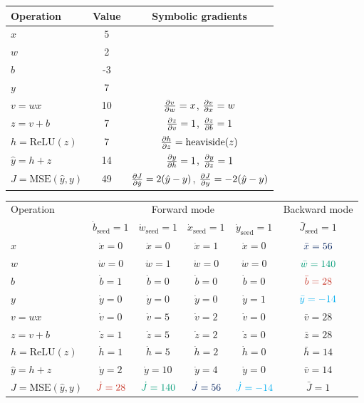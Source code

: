 \clearpage
\begin{solution}
\begin{center}
\begin{tabular}{lcc}
\toprule
Operation & Value & Symbolic gradients \\
\midrule
$x$ & 5 \\
$w$ & 2 \\
$b$ & -3 \\
$y$ & 7 \\
$v=wx$ & 10 & $\pdv{v}{w} = x$, $\pdv{v}{x} = w$ \\
$z=v+b$ & 7 & $\pdv{z}{v} = 1$, $\pdv{z}{b} = 1$\\
$h=\mathrm{ReLU}(z)$ & 7 & $\pdv{h}{z}=\mathrm{heaviside}(z)$ \\
$\hat y = h + z$ & 14 & $\pdv{y}{h}=1$, $\pdv{y}{z}=1$ \\
$J=\mathrm{MSE}(\hat y, y)$ & 49 & $\pdv{J}{\hat y}=2(\hat y - y)$, $\pdv{J}{y}=-2(\hat y - y)$ \\
\bottomrule
\end{tabular}
\end{center}

\begin{center}
\begin{tabular}{lccccc}
\toprule
Operation & \multicolumn{4}{c}{Forward mode} & Backward mode \\
& $\dot b_{\mathrm{seed}}=1$ & $\dot w_{\mathrm{seed}}=1$ & $\dot x_{\mathrm{seed}}=1$ & $\dot y_{\mathrm{seed}}=1$ & $\bar J_{\mathrm{seed}}=1$ \\
\midrule
$x$ & $\dot x = 0$ & $\dot x = 0$ & $\dot x = 1$ & $\dot x = 0$ & $\color{blue}\bar x = 56$ \\
$w$ & $\dot w = 0$ & $\dot w = 1$ & $\dot w = 0$ & $\dot w = 0$ & $\color{green}\bar w = 140$ \\
$b$ & $\dot b = 1$ & $\dot b = 0$ & $\dot b = 0$ & $\dot b = 0$ & $\color{red}\bar b = 28$ \\
$y$ & $\dot y = 0$ & $\dot y = 0$ & $\dot y = 0$ & $\dot y = 1$ & $\color{cyan}\bar y = -14$ \\
$v=wx$ & $\dot v = 0$ & $\dot v = 5$ & $\dot v = 2$ & $\dot v = 0$ & $\bar v = 28$ \\
$z=v+b$ & $\dot z = 1$ & $\dot z = 5$ & $\dot z = 2$ & $\dot z = 0$ & $\bar z = 28$ \\
$h=\mathrm{ReLU}(z)$ & $\dot h = 1$ & $\dot h = 5$ & $\dot h = 2$ & $\dot h = 0$ & $\bar h = 14$ \\
$\hat y = h + z$ & $\dot y = 2$ & $\dot y = 10$ & $\dot y = 4$ & $\dot y = 0$  & $\bar v = 14$\\
$J=\mathrm{MSE}(\hat y, y)$ & $\color{red}\dot J = 28$ & $\color{green}\dot J = 140$ & $\color{blue}\dot J = 56$ & $\color{cyan}\dot J = -14$ & $\bar J = 1$ \\
\bottomrule
\end{tabular}
\end{center}


\end{solution}
